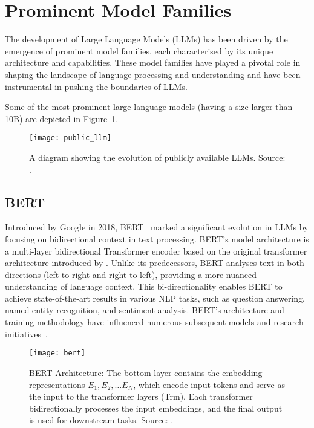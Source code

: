 \section{Prominent Model Families}
\label{sec:promiment-model-families}

The development of Large Language Models (LLMs) has been driven by the emergence of prominent model families, each characterised by its unique architecture and capabilities.
These model families have played a pivotal role in shaping the landscape of language processing and understanding and have been instrumental in pushing the boundaries of LLMs.

Some of the most prominent large language models (having a size larger than 10B) are depicted in Figure~\ref{fig:llm-evolution}.

\begin{figure}[h!]
	\centering
	\texttt{[image: public\_llm]}
	\caption{A diagram showing the evolution of publicly available LLMs. Source: \protect\textcite{survey}.}
	\label{fig:llm-evolution}
\end{figure}

\subsection{BERT}
\label{subsec:bert}

Introduced by Google in 2018, BERT~\cite{devlin2019bert} marked a significant evolution in LLMs by focusing on bidirectional context in text processing.
BERT's model architecture is a multi-layer bidirectional Transformer encoder based on the original transformer architecture introduced by \textcite{vaswani2023attention}.
Unlike its predecessors, BERT analyses text in both directions (left-to-right and right-to-left), providing a more nuanced understanding of language context.
This bi-directionality enables BERT to achieve state-of-the-art results in various NLP tasks, such as question answering, named entity recognition, and sentiment analysis.
BERT's architecture and training methodology have influenced numerous subsequent models and research initiatives~\cite{devlin2019bert}.

\begin{figure}[h!]
	\centering
	\texttt{[image: bert]}
	\caption{BERT Architecture: The bottom layer contains the embedding representations \(E_1, E_2, \ldots E_N\), which encode input tokens and serve as the input to the transformer layers (Trm).
		Each transformer bidirectionally processes the input embeddings, and the final output is used for downstream tasks. Source: \protect\textcite{devlin2019bert}.}
	\label{fig:bert-arch}
\end{figure}

